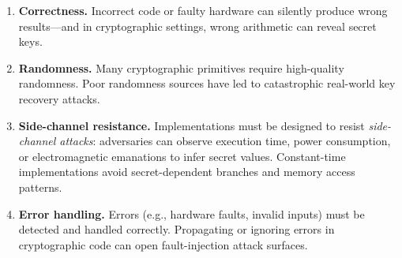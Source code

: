 \documentclass[11pt]{article}
\begin{document}
\begin{enumerate}[label=(\arabic*)]
  \item \textbf{Correctness.}  Incorrect code or faulty hardware can
    silently produce wrong results---and in cryptographic settings,
    wrong arithmetic can reveal secret keys.

  \item \textbf{Randomness.}  Many cryptographic primitives require
    high-quality randomness.  Poor randomness sources have led to
    catastrophic real-world key recovery attacks.

  \item \textbf{Side-channel resistance.}  Implementations must be
    designed to resist \emph{side-channel attacks}: adversaries can
    observe execution time, power consumption, or electromagnetic
    emanations to infer secret values.  Constant-time implementations
    avoid secret-dependent branches and memory access patterns.

  \item \textbf{Error handling.}  Errors (e.g., hardware faults,
    invalid inputs) must be detected and handled correctly.
    Propagating or ignoring errors in cryptographic code can open
    fault-injection attack surfaces.
\end{enumerate}

\end{document}
